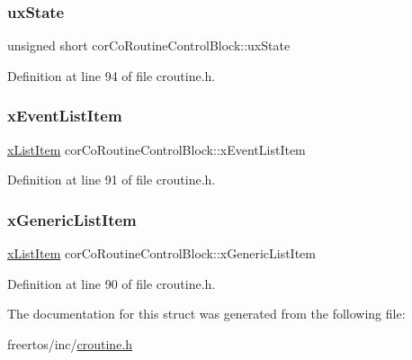 \subsubsection{\texorpdfstring{ux\+State}{uxState}}
{\footnotesize\ttfamily unsigned short cor\+Co\+Routine\+Control\+Block\+::ux\+State}



Definition at line 94 of file croutine.\+h.

\mbox{\label{structcorCoRoutineControlBlock_ae3df50ba6714e9c2683cefa31dc0bc50}} 
\subsubsection{\texorpdfstring{x\+Event\+List\+Item}{xEventListItem}}
{\footnotesize\ttfamily \hyperlink{list_8h_abc3e65a10b5c5f39142e64e69311797f}{x\+List\+Item} cor\+Co\+Routine\+Control\+Block\+::x\+Event\+List\+Item}



Definition at line 91 of file croutine.\+h.

\mbox{\label{structcorCoRoutineControlBlock_ad088a2410ffd125ce32562e2faa4861d}} 
\subsubsection{\texorpdfstring{x\+Generic\+List\+Item}{xGenericListItem}}
{\footnotesize\ttfamily \hyperlink{list_8h_abc3e65a10b5c5f39142e64e69311797f}{x\+List\+Item} cor\+Co\+Routine\+Control\+Block\+::x\+Generic\+List\+Item}



Definition at line 90 of file croutine.\+h.



The documentation for this struct was generated from the following file\+:\begin{DoxyCompactItemize}
\item 
freertos/inc/\hyperlink{croutine_8h}{croutine.\+h}\end{DoxyCompactItemize}
